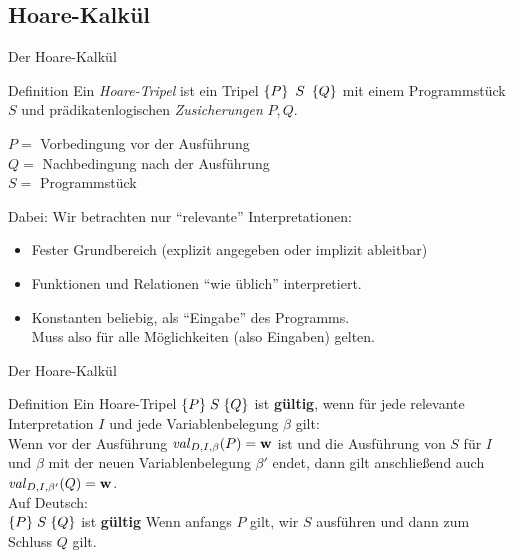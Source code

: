 \subsection{Hoare-Kalkül}
\begin{frame}{Der Hoare-Kalkül}
	\begin{block}{Definition}
		Ein \emph{Hoare-Tripel} ist ein Tripel $\left\{P\right\}\ S \ \left\{Q\right\}$ mit einem Programmstück $S$ und prädikatenlogischen \emph{Zusicherungen} $P,Q$.
	\end{block}
	\pause
	$P = $ Vorbedingung vor der Ausführung \\
	$Q = $ Nachbedingung nach der Ausführung\\
	$S = $ Programmstück
	
	\pause
	\bigskip
	Dabei: Wir betrachten nur \enquote{relevante} Interpretationen:
	\begin{itemize}[<+->]
		\item Fester Grundbereich (explizit angegeben oder implizit ableitbar)
		\item Funktionen und Relationen \enquote{wie üblich} interpretiert.
		\item Konstanten beliebig, als \enquote{Eingabe} des Programms.\\
		Muss also für alle Möglichkeiten (also Eingaben) gelten.
	\end{itemize}
\end{frame}

\begin{frame}{Der Hoare-Kalkül}
	\begin{block}{Definition}
		Ein Hoare-Tripel $\{P\}\;S\; \{Q\}$ ist \textbf{gültig}, wenn für jede relevante Interpretation $I$ und jede Variablenbelegung $\beta$ gilt:\\
		Wenn vor der Ausführung $\hbox{\textit{val}}_{D,I,\beta}(P)=\hbox{\textbf{w}}$ ist und die Ausführung von $S$ für $I$ und $\beta$ mit der neuen Variablenbelegung $\beta'$ endet, dann gilt anschließend auch $\hbox{\textit{val}}_{D,I,\beta'}(Q)=\hbox{\textbf{w}}$. \\
		\medskip
		Auf Deutsch: \\
		$\{P\}\;S\; \{Q\}$ ist \textbf{gültig} \Gdw Wenn anfangs $P$ gilt, wir $S$ ausführen und dann zum Schluss $Q$ gilt.
	\end{block}
\end{frame}

